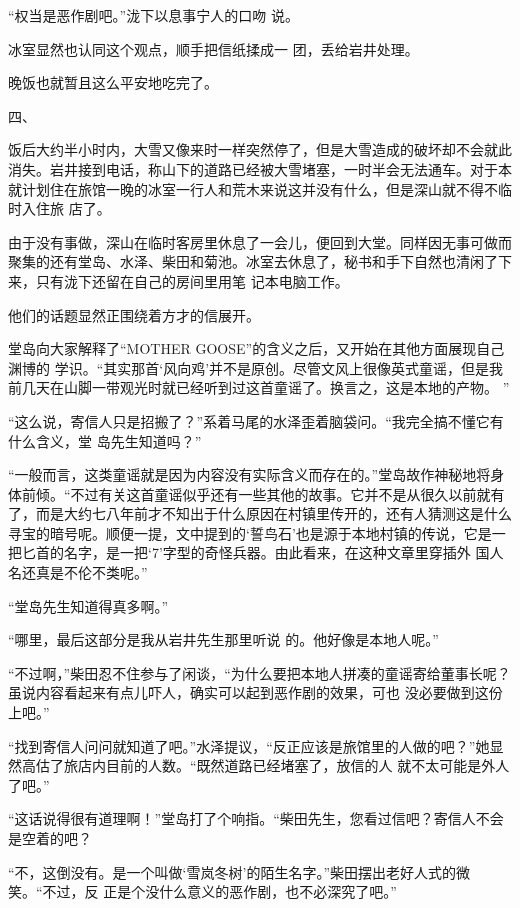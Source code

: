 \documentclass{article}
\begin{document}
“权当是恶作剧吧。”泷下以息事宁人的口吻
说。 

冰室显然也认同这个观点，顺手把信纸揉成一
团，丢给岩井处理。 

\newpage


晚饭也就暂且这么平安地吃完了。 


四、 

饭后大约半小时内，大雪又像来时一样突然停了，但是大雪造成的破坏却不会就此消失。岩井接到电话，称山下的道路已经被大雪堵塞，一时半会无法通车。对于本就计划住在旅馆一晚的冰室一行人和荒木来说这并没有什么，但是深山就不得不临时入住旅
店了。 

由于没有事做，深山在临时客房里休息了一会儿，便回到大堂。同样因无事可做而聚集的还有堂岛、水泽、柴田和菊池。冰室去休息了，秘书和手下自然也清闲了下来，只有泷下还留在自己的房间里用笔
记本电脑工作。 


他们的话题显然正围绕着方才的信展开。 

堂岛向大家解释了“MOTHER GOOSE”的含义之后，又开始在其他方面展现自己渊博的
\newpage
学识。“其实那首‘风向鸡’并不是原创。尽管文风上很像英式童谣，但是我前几天在山脚一带观光时就已经听到过这首童谣了。换言之，这是本地的产物。
” 

“这么说，寄信人只是招搬了？”系着马尾的水泽歪着脑袋问。“我完全搞不懂它有什么含义，堂
岛先生知道吗？” 

“一般而言，这类童谣就是因为内容没有实际含义而存在的。”堂岛故作神秘地将身体前倾。“不过有关这首童谣似乎还有一些其他的故事。它并不是从很久以前就有了，而是大约七八年前才不知出于什么原因在村镇里传开的，还有人猜测这是什么寻宝的暗号呢。顺便一提，文中提到的‘誓鸟石’也是源于本地村镇的传说，它是一把匕首的名字，是一把‘7’字型的奇怪兵器。由此看来，在这种文章里穿插外
国人名还真是不伦不类呢。” 


“堂岛先生知道得真多啊。” 

\newpage

“哪里，最后这部分是我从岩井先生那里听说
的。他好像是本地人呢。” 

“不过啊，”柴田忍不住参与了闲谈，“为什么要把本地人拼凑的童谣寄给董事长呢？虽说内容看起来有点儿吓人，确实可以起到恶作剧的效果，可也
没必要做到这份上吧。” 

“找到寄信人问问就知道了吧。”水泽提议，“反正应该是旅馆里的人做的吧？”她显然高估了旅店内目前的人数。“既然道路已经堵塞了，放信的人
就不太可能是外人了吧。” 

“这话说得很有道理啊！”堂岛打了个响指。“柴田先生，您看过信吧？寄信人不会是空着的吧？

“不，这倒没有。是一个叫做‘雪岚冬树’的陌生名字。”柴田摆出老好人式的微笑。“不过，反
正是个没什么意义的恶作剧，也不必深究了吧。” 
\end{document}
